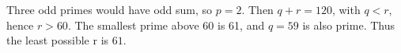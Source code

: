 Three odd primes would have odd sum, so $p=2$. Then $q+r=120$, with $q<r$, hence $r>60$. The smallest prime above 60 is 61, and $q=59$ is also prime. Thus the least possible r is $\boxed{61}$.
